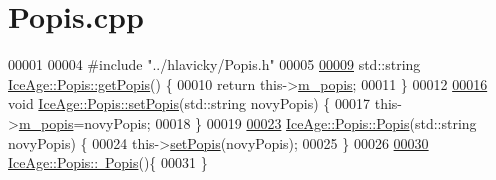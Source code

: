 \hypertarget{Popis_8cpp_source}{}\section{Popis.\+cpp}
\label{Popis_8cpp_source}

\begin{DoxyCode}
00001 
00004 \textcolor{preprocessor}{#include "../hlavicky/Popis.h"}
00005 
\hypertarget{Popis_8cpp_source.tex_l00009}{}\hyperlink{classIceAge_1_1Popis_a64fb2b82bb634ebe8194484711ec22c1}{00009} std::string \hyperlink{classIceAge_1_1Popis_a64fb2b82bb634ebe8194484711ec22c1}{IceAge::Popis::getPopis}() \{
00010     \textcolor{keywordflow}{return} this->\hyperlink{classIceAge_1_1Popis_a1bde418d006647e86ca0811cacd0cd65}{m\_popis};
00011 \}
00012 
\hypertarget{Popis_8cpp_source.tex_l00016}{}\hyperlink{classIceAge_1_1Popis_a9a1973711a1f7d5d533734f13813fcd9}{00016} \textcolor{keywordtype}{void} \hyperlink{classIceAge_1_1Popis_a9a1973711a1f7d5d533734f13813fcd9}{IceAge::Popis::setPopis}(std::string novyPopis) \{
00017     this->\hyperlink{classIceAge_1_1Popis_a1bde418d006647e86ca0811cacd0cd65}{m\_popis}=novyPopis;
00018 \}
00019 
\hypertarget{Popis_8cpp_source.tex_l00023}{}\hyperlink{classIceAge_1_1Popis_a19cf552765d577e462b5c40ccc5ab7e1}{00023} \hyperlink{classIceAge_1_1Popis_a19cf552765d577e462b5c40ccc5ab7e1}{IceAge::Popis::Popis}(std::string novyPopis) \{
00024     this->\hyperlink{classIceAge_1_1Popis_a9a1973711a1f7d5d533734f13813fcd9}{setPopis}(novyPopis);
00025 \}
00026 
\hypertarget{Popis_8cpp_source.tex_l00030}{}\hyperlink{classIceAge_1_1Popis_a3ba5866c6cbd58514918ea72790a5689}{00030} \hyperlink{classIceAge_1_1Popis_a3ba5866c6cbd58514918ea72790a5689}{IceAge::Popis::~Popis}()\{
00031 \}
\end{DoxyCode}
